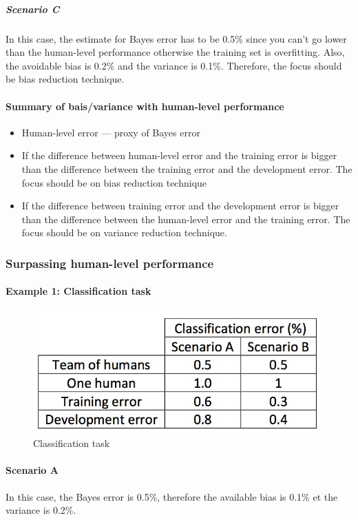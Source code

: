 \documentclass[UTF8]{article}
\begin{document}
\subparagraph{Scenario C}
In this case, the estimate for Bayes error has to be 0.5\% since you can't go lower than the
human-level performance otherwise the training set is overfitting. Also, the avoidable bias is
0.2\% and the variance is 0.1\%. Therefore, the focus should be bias reduction technique.

\paragraph{Summary of bais/variance with human-level performance}
\begin{itemize}
    \item Human-level error --- proxy of Bayes error
    \item If the difference between human-level error and the training error is bigger than the
    difference between the training error and the development error. The focus should be on bias
    reduction technique
    \item If the difference between training error and the development error is bigger than the
    difference between the human-level error and the training error. The focus should be on
    variance reduction technique.
\end{itemize}

\subsubsection{Surpassing human-level performance}
\paragraph{Example 1: Classification task}
\begin{figure}[htb]
    \centering
    \includegraphics[width=30em]{figures/surpass-human-level}
    \caption{Classification task}
    \label{figures/surpass-human-level}
\end{figure}

\paragraph{Scenario A}
In this case, the Bayes error is 0.5\%, therefore the available bias is 0.1\% et the variance is
0.2\%.
\end{document}
